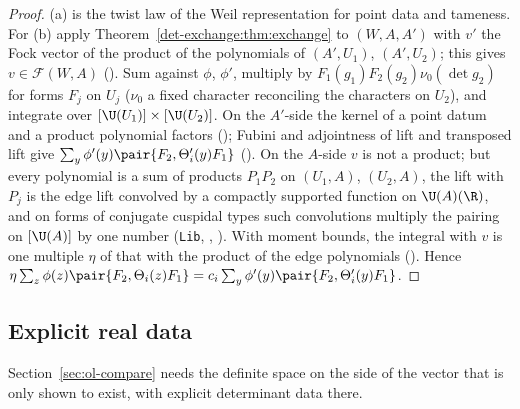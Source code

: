 \begin{proof}
(a) is the twist law of the Weil representation for point data and tameness. For (b) apply
Theorem~\ref{det-exchange:thm:exchange} to $(W,A,A')$ with $v'$ the Fock vector of the product of
the polynomials of $(A',U_1)$, $(A',U_2)$; this gives $v\in\mathcal F(W,A)$
(). Sum against $\phi$,
$\phi'$, multiply by $F_1(g_1)F_2(g_2)\nu_0(\det g_2)$ for forms $F_j$ on $U_j$ ($\nu_0$ a fixed
character reconciling the characters on $U_2$), and integrate over $[\U(U_1)]\times[\U(U_2)]$. On
the $A'$-side the kernel of a point datum and a product polynomial factors
(); Fubini and adjointness of lift and transposed lift
give $\sum_y\phi'(y)\pair{F_2,\Theta'_i(y)F_1}$
(). On
the $A$-side $v$ is not a product; but every polynomial is a sum of products
$P_1P_2$ on $(U_1,A)$, $(U_2,A)$, the lift with $P_j$ is the edge lift convolved by a compactly
supported function on $\U(A)(\R)$, and on forms of conjugate cuspidal types such convolutions
multiply the pairing on $[\U(A)]$ by one number (\texttt{Lib},
,
). With moment bounds, the integral with $v$
is one multiple $\eta$ of that with the product of the edge polynomials
(). Hence
$\eta\sum_z\phi(z)\pair{F_2,\Theta_i(z)F_1}=c_i\sum_y\phi'(y)\pair{F_2,\Theta'_i(y)F_1}$.
\end{proof}

\subsection{Explicit real data}

Section~\ref{sec:ol-compare} needs the definite space on the side of the vector that is only shown to
exist, with explicit determinant data there.

